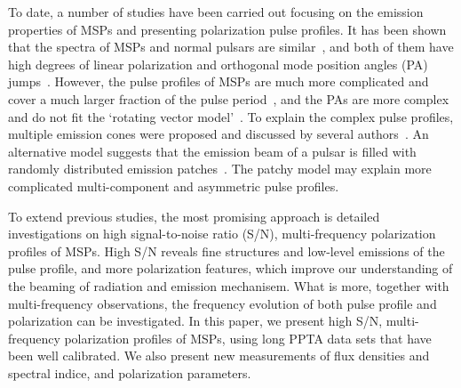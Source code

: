 \documentclass[useAMS,usenatbib]{mn2e}
\begin{document}
To date, a number of studies have been carried out focusing on the emission 
properties of MSPs and presenting polarization pulse profiles.
%
It has been shown that the spectra of MSPs and normal pulsars are similar~\citep{Toscano98,Kramer98,Kramer99}, 
and both of them have high degrees of linear polarization and orthogonal mode 
position angles (PA) jumps~\citep[see e.g.,][]{Thorsett90,Navarro97,Stairs99,Manchester04,Ord04}.
%
However, the pulse profiles of MSPs are much more complicated and cover a much 
larger fraction of the pulse period~\citep{Yan11}, and the PAs are more complex 
and do not fit the `rotating vector model'~\citep[RVM,][]{Radhakrishnan69}.
%
To explain the complex pulse profiles, multiple emission cones were proposed 
and discussed by several authors~\citep{Rankin93,Kramer94,Gupta03}. An alternative 
model suggests that the emission beam of a pulsar is filled with randomly 
distributed emission patches~\citep{Lyne88,Manchester95_2,Han01}. The patchy 
model may explain more complicated multi-component and asymmetric pulse profiles.
%

To extend previous studies, the most promising approach is detailed investigations 
on high signal-to-noise ratio (S/N), multi-frequency polarization profiles of MSPs. 
%
High S/N reveals fine structures and low-level emissions of the pulse profile, and
more polarization features, which improve our understanding of the beaming of radiation
and emission mechanisem.
%
What is more, together with multi-frequency observations, the frequency evolution 
of both pulse profile and polarization can be investigated.
%
%
In this paper, we present high S/N, multi-frequency polarization 
profiles of MSPs, using long PPTA data sets that have been well calibrated.
%
We also present new measurements of flux densities and spectral indice, 
and polarization parameters.
%
\end{document}
